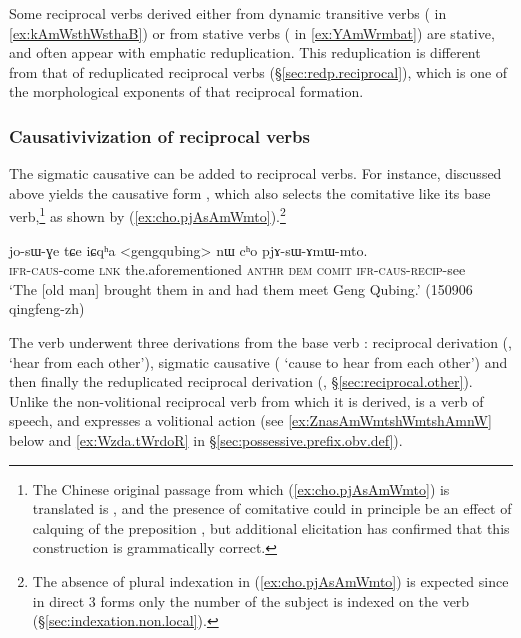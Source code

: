 Some reciprocal verbs derived either from dynamic transitive verbs ( in \ref{ex:kAmWsthWsthaB}) or from stative verbs ( in \ref{ex:YAmWrmbat}) are stative, and often appear with emphatic reduplication. This reduplication is different from that of reduplicated reciprocal verbs (§\ref{sec:redp.reciprocal}), which is one of the morphological exponents of that reciprocal formation.

\subsubsection{Causativivization of  reciprocal verbs} \label{sec:sAmW}
 
The sigmatic causative can be added to  reciprocal verbs. For instance,  discussed above yields the causative form , which also selects the comitative like its base verb,\footnote{The Chinese original passage from which (\ref{ex:cho.pjAsAmWmto}) is translated is , and the presence of comitative could in principle be an effect of calquing of the preposition , but additional elicitation has confirmed that this construction is grammatically correct. }
 as shown by (\ref{ex:cho.pjAsAmWmto}).\footnote{The absence of plural indexation in (\ref{ex:cho.pjAsAmWmto}) is expected since in direct 3\flobv{} forms only the number of the subject is indexed on the verb (§\ref{sec:indexation.non.local}). }


\begin{exe}
\ex \label{ex:cho.pjAsAmWmto}
\gll jo-sɯ-ɣe tɕe iɕqʰa <gengqubing> nɯ cʰo pjɤ-sɯ-ɤmɯ-mto.  \\
\textsc{ifr}-\textsc{caus}-come \textsc{lnk} the.aforementioned  \textsc{anthr} \textsc{dem} \textsc{comit} \textsc{ifr}-\textsc{caus}-\textsc{recip}-see \\
\glt `The [old man] brought them in and had them meet Geng Qubing.' (150906 qingfeng-zh) 
\end{exe}

The verb  underwent three derivations from the base verb :  reciprocal derivation (, `hear from each other'), sigmatic causative ( `cause to hear from each other') and then finally the reduplicated reciprocal derivation (, §\ref{sec:reciprocal.other}). Unlike the non-volitional reciprocal verb  from which it is derived,  is a verb of speech, and expresses a volitional action (see \ref{ex:ZnasAmWmtshWmtshAmnW} below and \ref{ex:Wzda.tWrdoR} in §\ref{sec:possessive.prefix.obv.def}). 

